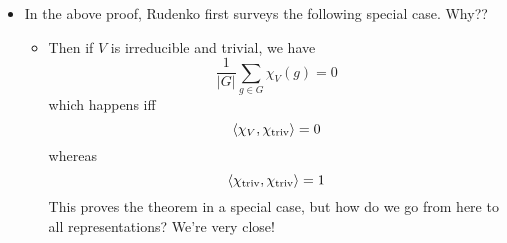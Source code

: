 \documentclass[../notes.tex]{subfiles}
\begin{document}
\begin{itemize}
\begin{proof}
        We will work towards a formula for the inner product, using various results that we've proven up until now. Let's begin.
        \begin{align*}
            \inp{\chi_V,\chi_W} &= \frac{1}{|G|}\sum_{g\in G}\chi_V(g)\cdot\overline{\chi_W(g)}\tag*{Definition}\\
            &= \frac{1}{|G|}\sum_{g\in G}\chi_V(g)\cdot\chi_{W^*}(g)\tag*{Property 4}\\
            &= \frac{1}{|G|}\sum_{g\in G}\chi_{V\otimes W^*}(g)\tag*{Property 5}\\
            &= \dim[(V\otimes W^*)^G]\tag*{Lemma 3}\\
            &= \dim([\Hom_F(V,W)]^G)\tag*{Lecture 2.1}\\
            &= \dim[\Hom_G(V,W)]\tag*{PSet 2, Q4b}\\
            &=
            \begin{cases}
                \dim(\spn(I)) & V\cong W\\
                \dim(\spn(0)) & V\ncong W
            \end{cases}
            \tag*{Schur's Lemma}\\
            &=
            \begin{cases}
                0 & V\ncong W\\
                1 & V\cong W
            \end{cases}
        \end{align*}
    \end{proof}
    \item In the above proof, Rudenko first surveys the following special case. Why??
    \begin{itemize}
        \item Then if $V$ is irreducible and trivial, we have
        \begin{equation*}
            \frac{1}{|G|}\sum_{g\in G}\chi_V(g) = 0
        \end{equation*}
        which happens iff
        \begin{equation*}
            \left\langle{\chi_V,\chi_\text{triv}}\right\rangle = 0
        \end{equation*}
        whereas
        \begin{equation*}
            \left\langle{\chi_\text{triv},\chi_\text{triv}}\right\rangle = 1
        \end{equation*}
        This proves the theorem in a special case, but how do we go from here to all representations? We're very close!
    \end{itemize}

\end{itemize}
\end{document}

